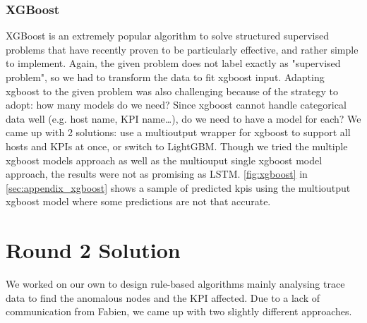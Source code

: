\documentclass[acmsmall, screen, nonacm]{acmart}
\begin{document}
\subsubsection*{XGBoost}
XGBoost is an extremely popular algorithm to solve structured supervised problems that have recently proven to be particularly effective, and rather simple to implement.
Again, the given problem does not label exactly as "supervised problem", so we had to transform the data to fit xgboost input.
Adapting xgboost to the given problem was also challenging because of the strategy to adopt: how many models do we need? 
Since xgboost cannot handle categorical data well \cite{chen_xgboost_2016} (e.g. host name, KPI name\dots), do we need to have a model for each? 
We came up with 2 solutions: use a multioutput wrapper for xgboost to support all hosts and KPIs at once, or switch to LightGBM.
Though we tried the multiple xgboost models approach as well as the multiouput single xgboost model approach, the results were not as promising as LSTM. 
\autoref{fig:xgboost} in \autoref{sec:appendix_xgboost} shows a sample of predicted kpis using the multioutput xgboost model where some predictions are not that accurate.

\section{Round 2 Solution}
We worked on our own to design rule-based algorithms mainly analysing trace data to find the anomalous nodes and the KPI affected. Due to a lack of communication from Fabien, we came up with two slightly different approaches.
\end{document}
